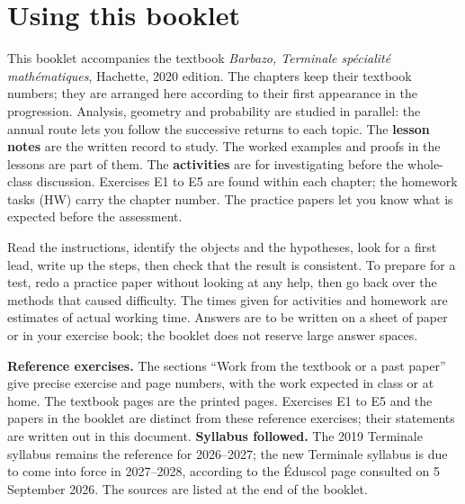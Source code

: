 \chapter*{Using this booklet}
This booklet accompanies the textbook \emph{Barbazo, Terminale spécialité mathématiques}, Hachette, 2020 edition. The chapters keep their textbook numbers; they are arranged here according to their first appearance in the progression. Analysis, geometry and probability are studied in parallel: the annual route lets you follow the successive returns to each topic.
The \textbf{lesson notes} are the written record to study. The worked examples and proofs in the lessons are part of them. The \textbf{activities} are for investigating before the whole-class discussion. Exercises E1 to E5 are found within each chapter; the homework tasks (HW) carry the chapter number. The practice papers let you know what is expected before the assessment.
\begin{keypoint}
Read the instructions, identify the objects and the hypotheses, look for a first lead, write up the steps, then check that the result is consistent. To prepare for a test, redo a practice paper without looking at any help, then go back over the methods that caused difficulty.
The times given for activities and homework are estimates of actual working time. Answers are to be written on a sheet of paper or in your exercise book; the booklet does not reserve large answer spaces.
\end{keypoint}
\textbf{Reference exercises.} The sections ``Work from the textbook or a past paper'' give precise exercise and page numbers, with the work expected in class or at home. The textbook pages are the printed pages. Exercises E1 to E5 and the papers in the booklet are distinct from these reference exercises; their statements are written out in this document.
\textbf{Syllabus followed.} The 2019 Terminale syllabus remains the reference for 2026--2027; the new Terminale syllabus is due to come into force in 2027--2028, according to the Éduscol page consulted on 5 September 2026. The sources are listed at the end of the booklet.
\ifmxteacher
\mxnewpage
